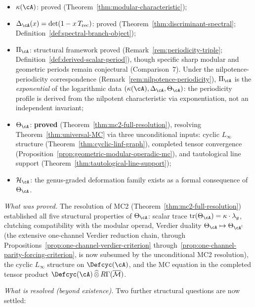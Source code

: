 \begin{itemize}[nosep]
\item $\kappa(\cA)$: proved (Theorem~\ref{thm:modular-characteristic});
\item $\Delta_{\cA}(x) = \det(1 - x\,T_{\mathrm{rec}})$: proved
  (Theorem~\ref{thm:discriminant-spectral};
  Definition~\ref{def:spectral-branch-object});
\item $\Pi_{\cA}$: structural framework proved
  (Remark~\ref{rem:periodicity-triple};
  Definition~\ref{def:derived-scalar-period}), though
  specific sharp modular and geometric periods remain conjectural
  (Comparison~7).  Under the nilpotence-periodicity correspondence
  (Remark~\ref{rem:nilpotence-periodicity}), $\Pi_{\cA}$ is the
  \emph{exponential} of the logarithmic data
  $(\kappa(\cA), \Delta_{\cA}, \Theta_{\cA})$: the periodicity
  profile is derived from the nilpotent characteristic via
  exponentiation, not an independent invariant;
\item $\Theta_{\cA}$: \textbf{proved}
  (Theorem~\ref{thm:mc2-full-resolution}), resolving
  Theorem~\ref{thm:universal-MC} via three unconditional inputs:
  cyclic $L_\infty$ structure
  (Theorem~\ref{thm:cyclic-linf-graph}),
  completed tensor convergence
  (Proposition~\ref{prop:geometric-modular-operadic-mc}),
  and tautological line support
  (Theorem~\ref{thm:tautological-line-support});
\item $\mathcal{H}_{\cA}$: the genus-graded deformation family
  exists as a formal consequence of $\Theta_{\cA}$.
\end{itemize}

\emph{What was proved.}
The resolution of MC2 (Theorem~\ref{thm:mc2-full-resolution})
established all five structural properties of $\Theta_{\cA}$:
scalar trace $\operatorname{tr}(\Theta_{\cA}) = \kappa \cdot
\lambda_g$, clutching compatibility with the modular operad,
Verdier duality $\Theta_{\cA} \mapsto \Theta_{\cA^!}$
(the extensive one-channel Verdier reduction chain, through
Propositions~\ref{prop:one-channel-verdier-criterion}
through~\ref{prop:one-channel-parity-forcing-criterion},
is now subsumed by the unconditional MC2 resolution),
the cyclic $L_\infty$ structure on $\Defcyc(\cA)$, and the MC
equation in the completed tensor product
$\Defcyc(\cA) \,\widehat{\otimes}\, R\Gamma(\overline{\mathcal{M}})$.

\emph{What is resolved (beyond existence).}
Two further structural questions are now settled:

